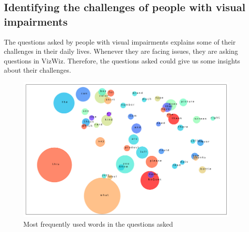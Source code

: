 \documentclass[sigconf]{acmart}
\begin{document}
\subsection{Identifying the challenges of people with visual impairments}
The questions asked by people with visual impairments explains some of their challenges in their daily lives. Whenever they are facing issues, they are asking questions in VizWiz. Therefore, the questions asked could give us some insights about their challenges.
\begin{figure}[hbp]
        \centering
        
        \includegraphics[width=\columnwidth]{images/uni_all.png}  
        \caption{Most frequently used words in the questions asked} 
          \label{fig:uni_all}   
      
        
\end{figure}
\end{document}
